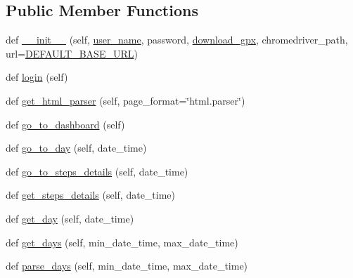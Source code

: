 \subsection*{Public Member Functions}
\begin{DoxyCompactItemize}
\item 
def \hyperlink{classpygce_1_1models_1_1bot_1_1_garmin_connect_bot_aeb909c53e6a647b5e8419d4877ba5b6d}{\+\_\+\+\_\+init\+\_\+\+\_\+} (self, \hyperlink{classpygce_1_1models_1_1bot_1_1_garmin_connect_bot_a259da08c172fe9b54bbb6b997ab840a7}{user\+\_\+name}, password, \hyperlink{classpygce_1_1models_1_1bot_1_1_garmin_connect_bot_a81b2ce5ff74592aeb9b1d8ebc236bfe4}{download\+\_\+gpx}, chromedriver\+\_\+path, url=\hyperlink{classpygce_1_1models_1_1bot_1_1_garmin_connect_bot_a860621296516b8e3793321d0773e30f3}{D\+E\+F\+A\+U\+L\+T\+\_\+\+B\+A\+S\+E\+\_\+\+U\+RL})
\item 
def \hyperlink{classpygce_1_1models_1_1bot_1_1_garmin_connect_bot_a31c8153cff1e4c2ce2a66d3b3aada3f1}{login} (self)
\item 
def \hyperlink{classpygce_1_1models_1_1bot_1_1_garmin_connect_bot_ad276eeef1f1fa248b1461235bbbef2b1}{get\+\_\+html\+\_\+parser} (self, page\+\_\+format=\char`\"{}html.\+parser\char`\"{})
\item 
def \hyperlink{classpygce_1_1models_1_1bot_1_1_garmin_connect_bot_ad9433580f9aced25b650ddd5e912cc52}{go\+\_\+to\+\_\+dashboard} (self)
\item 
def \hyperlink{classpygce_1_1models_1_1bot_1_1_garmin_connect_bot_a3a0df451b2e7c0667064adc5c0ba1ad5}{go\+\_\+to\+\_\+day} (self, date\+\_\+time)
\item 
def \hyperlink{classpygce_1_1models_1_1bot_1_1_garmin_connect_bot_a1ff345f9d9116b4c1cc1718f38b84e5b}{go\+\_\+to\+\_\+steps\+\_\+details} (self, date\+\_\+time)
\item 
def \hyperlink{classpygce_1_1models_1_1bot_1_1_garmin_connect_bot_a75340bb4b6cd7c35f8d6de1068bcd626}{get\+\_\+steps\+\_\+details} (self, date\+\_\+time)
\item 
def \hyperlink{classpygce_1_1models_1_1bot_1_1_garmin_connect_bot_ab5ab1e855230273b7c7c085a461a3ed2}{get\+\_\+day} (self, date\+\_\+time)
\item 
def \hyperlink{classpygce_1_1models_1_1bot_1_1_garmin_connect_bot_a18ab2d80266a9da67186bcba6b4856b9}{get\+\_\+days} (self, min\+\_\+date\+\_\+time, max\+\_\+date\+\_\+time)
\item 
def \hyperlink{classpygce_1_1models_1_1bot_1_1_garmin_connect_bot_a17c3b23e3a712395581e88294308b822}{parse\+\_\+days} (self, min\+\_\+date\+\_\+time, max\+\_\+date\+\_\+time)

\end{DoxyCompactItemize}
